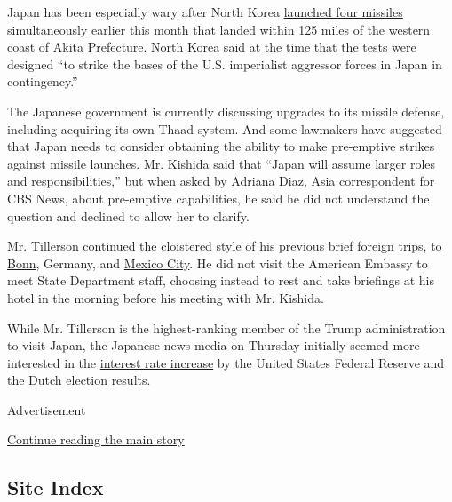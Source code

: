Japan has been especially wary after North Korea
\href{https://www.nytimes.com/2017/03/06/world/asia/north-korea-missiles-japan.html}{launched
four missiles simultaneously} earlier this month that landed within 125
miles of the western coast of Akita Prefecture. North Korea said at the
time that the tests were designed ``to strike the bases of the U.S.
imperialist aggressor forces in Japan in contingency.''

The Japanese government is currently discussing upgrades to its missile
defense, including acquiring its own Thaad system. And some lawmakers
have suggested that Japan needs to consider obtaining the ability to
make pre-emptive strikes against missile launches. Mr. Kishida said that
``Japan will assume larger roles and responsibilities,'' but when asked
by Adriana Diaz, Asia correspondent for CBS News, about pre-emptive
capabilities, he said he did not understand the question and declined to
allow her to clarify.

Mr. Tillerson continued the cloistered style of his previous brief
foreign trips, to
\href{https://www.nytimes.com/2017/02/15/world/europe/germany-rex-tillerson.html}{Bonn},
Germany, and
\href{https://www.nytimes.com/2017/02/22/world/americas/rex-tillerson-mexico-border-relations.html}{Mexico
City}. He did not visit the American Embassy to meet State Department
staff, choosing instead to rest and take briefings at his hotel in the
morning before his meeting with Mr. Kishida.

While Mr. Tillerson is the highest-ranking member of the Trump
administration to visit Japan, the Japanese news media on Thursday
initially seemed more interested in the
\href{https://www.nytimes.com/2017/03/15/business/economy/fed-interest-rates-yellen.html?hp\&action=click\&pgtype=Homepage\&clickSource=story-heading\&module=first-column-region\&region=top-news\&WT.nav=top-news}{interest
rate increase} by the United States Federal Reserve and the
\href{https://www.nytimes.com/2017/03/15/world/europe/geert-wilders-netherlands-far-right-vote.html?hp\&action=click\&pgtype=Homepage\&clickSource=story-heading\&module=second-column-region\&region=top-news\&WT.nav=top-news}{Dutch
election} results.

Advertisement

\protect\hyperlink{after-bottom}{Continue reading the main story}

\hypertarget{site-index}{%
\subsection{Site Index}\label{site-index}}

